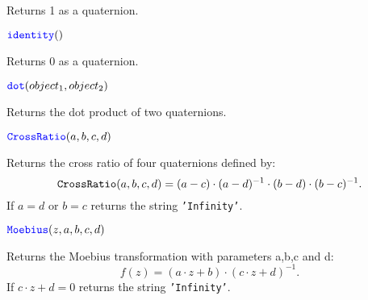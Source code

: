 \documentclass[11pt]{paper}
\begin{document}
Returns 1 as a quaternion.

\medskip
\noindent $\textcolor{blue}{\texttt{\mbox{identity}}}()$ 

Returns 0 as a quaternion.


\medskip
\noindent $\textcolor{blue}{\texttt{\mbox{dot}}}(object_1,object_2)$ 

Returns the dot product of two quaternions.


\medskip


\noindent $\textcolor{blue}{\texttt{\mbox{CrossRatio}}}(a,b,c,d)$ 

Returns the cross ratio of four quaternions defined by:
$$
{\texttt{\mbox{CrossRatio}}}(a,b,c,d) = (a-c)\cdot(a-d)^{-1}\cdot(b-d)\cdot(b-c)^{-1}.
$$ 
If $a = d$ or $b = c$ returns the string \texttt{\mbox{'Infinity'}}.

\medskip

\pagebreak

\noindent $\textcolor{blue}{\texttt{\mbox{Moebius}}}(z,a,b,c,d)$ 

Returns the Moebius transformation with parameters a,b,c and d:
$$
f(z)=(a\cdot z+b)\cdot(c\cdot z+d)^{-1}. 
$$
If $c \cdot z + d = 0$ returns the string \texttt{\mbox{'Infinity'}}. 

\bigskip
\end{document}
